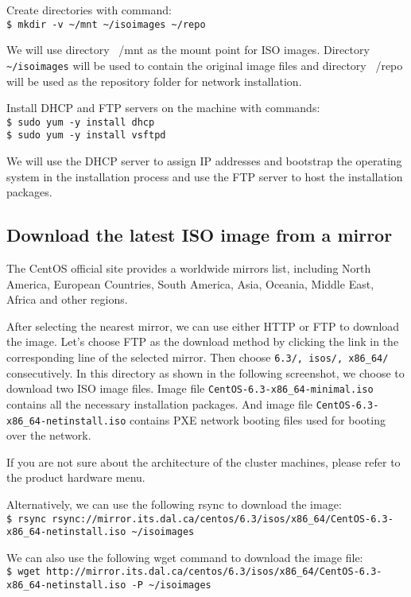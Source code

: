 Create directories with command: \\
\verb|$ mkdir -v ~/mnt ~/isoimages ~/repo|

We will use directory ~/mnt as the mount point for ISO images. Directory \verb|~/isoimages| will be used to contain the original image files and directory ~/repo will be used as the repository folder for network installation.

Install DHCP and FTP servers on the machine with commands: \\
\verb|$ sudo yum -y install dhcp| \\
\verb|$ sudo yum -y install vsftpd| 

We will use the DHCP server to assign IP addresses and bootstrap the operating system in the installation process and use the FTP server to host the installation packages.
\subsection*{Download the latest ISO image from a mirror}
The CentOS official site provides a worldwide mirrors list, including North America, European Countries, South America, Asia, Oceania, Middle East, Africa and other regions.

After selecting the nearest mirror, we can use either HTTP or FTP to download the image. Let's choose FTP as the download method by clicking the link in the corresponding line of the selected mirror. Then choose \verb|6.3/, isos/, x86_64/| consecutively. In this directory as shown in the following screenshot, we choose to download two ISO image files. Image file \verb|CentOS-6.3-x86_64-minimal.iso| contains all the necessary installation packages. And image file \verb|CentOS-6.3-x86_64-netinstall.iso| contains PXE network booting files used for booting over the network.

If you are not sure about the architecture of the cluster machines, please refer to the product hardware menu.

Alternatively, we can use the following rsync to download the image: \\
\verb|$ rsync rsync://mirror.its.dal.ca/centos/6.3/isos/x86_64/CentOS-6.3-x86_64-netinstall.iso ~/isoimages|

We can also use the following wget command to download the image file: \\
\verb|$ wget http://mirror.its.dal.ca/centos/6.3/isos/x86_64/CentOS-6.3-x86_64-netinstall.iso -P ~/isoimages|

